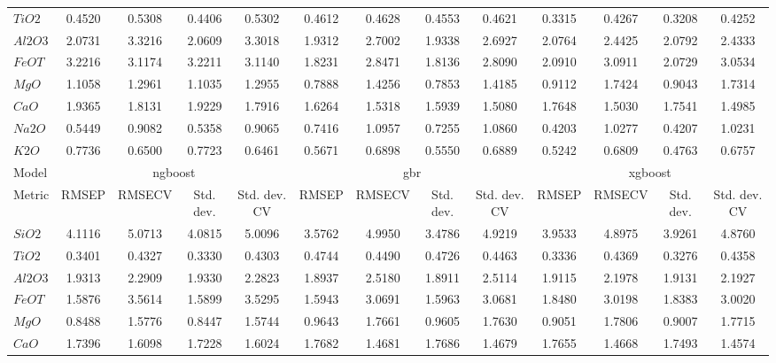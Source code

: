 \begin{table*}[]
{\begin{tabular}{l|cccc|cccc|cccc}
$TiO2$ & 0.4520 & 0.5308 & 0.4406 & 0.5302 & 0.4612 & 0.4628 & 0.4553 & 0.4621 & 0.3315 & 0.4267 & 0.3208 & 0.4252 \\
$Al2O3$ & 2.0731 & 3.3216 & 2.0609 & 3.3018 & 1.9312 & 2.7002 & 1.9338 & 2.6927 & 2.0764 & 2.4425 & 2.0792 & 2.4333 \\
$FeOT$ & 3.2216 & 3.1174 & 3.2211 & 3.1140 & 1.8231 & 2.8471 & 1.8136 & 2.8090 & 2.0910 & 3.0911 & 2.0729 & 3.0534 \\
$MgO$ & 1.1058 & 1.2961 & 1.1035 & 1.2955 & 0.7888 & 1.4256 & 0.7853 & 1.4185 & 0.9112 & 1.7424 & 0.9043 & 1.7314 \\
$CaO$ & 1.9365 & 1.8131 & 1.9229 & 1.7916 & 1.6264 & 1.5318 & 1.5939 & 1.5080 & 1.7648 & 1.5030 & 1.7541 & 1.4985 \\
$Na2O$ & 0.5449 & 0.9082 & 0.5358 & 0.9065 & 0.7416 & 1.0957 & 0.7255 & 1.0860 & 0.4203 & 1.0277 & 0.4207 & 1.0231 \\
$K2O$ & 0.7736 & 0.6500 & 0.7723 & 0.6461 & 0.5671 & 0.6898 & 0.5550 & 0.6889 & 0.5242 & 0.6809 & 0.4763 & 0.6757 \\
\hline
Model & \multicolumn{4}{c}{\gls{ngboost}} & \multicolumn{4}{c}{\gls{gbr}} & \multicolumn{4}{c}{\gls{xgboost}} \\
Metric & \multicolumn{1}{c}{RMSEP} & \multicolumn{1}{c}{RMSECV} & \multicolumn{1}{c}{Std. dev.} & \multicolumn{1}{c}{Std. dev. CV} & \multicolumn{1}{c}{RMSEP} & \multicolumn{1}{c}{RMSECV} & \multicolumn{1}{c}{Std. dev.} & \multicolumn{1}{c}{Std. dev. CV} & \multicolumn{1}{c}{RMSEP} & \multicolumn{1}{c}{RMSECV} & \multicolumn{1}{c}{Std. dev.} & \multicolumn{1}{c}{Std. dev. CV} \\
\hline
$SiO2$ & 4.1116 & 5.0713 & 4.0815 & 5.0096 & 3.5762 & 4.9950 & 3.4786 & 4.9219 & 3.9533 & 4.8975 & 3.9261 & 4.8760 \\
$TiO2$ & 0.3401 & 0.4327 & 0.3330 & 0.4303 & 0.4744 & 0.4490 & 0.4726 & 0.4463 & 0.3336 & 0.4369 & 0.3276 & 0.4358 \\
$Al2O3$ & 1.9313 & 2.2909 & 1.9330 & 2.2823 & 1.8937 & 2.5180 & 1.8911 & 2.5114 & 1.9115 & 2.1978 & 1.9131 & 2.1927 \\
$FeOT$ & 1.5876 & 3.5614 & 1.5899 & 3.5295 & 1.5943 & 3.0691 & 1.5963 & 3.0681 & 1.8480 & 3.0198 & 1.8383 & 3.0020 \\
$MgO$ & 0.8488 & 1.5776 & 0.8447 & 1.5744 & 0.9643 & 1.7661 & 0.9605 & 1.7630 & 0.9051 & 1.7806 & 0.9007 & 1.7715 \\
$CaO$ & 1.7396 & 1.6098 & 1.7228 & 1.6024 & 1.7682 & 1.4681 & 1.7686 & 1.4679 & 1.7655 & 1.4668 & 1.7493 & 1.4574 \\

\end{tabular}}
\end{table*}
